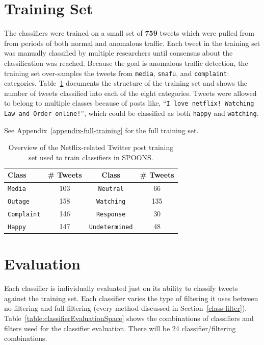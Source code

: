 \documentclass[12pt]{ucthesis}
\begin{document}
\section{Training Set}
\label{class-training-set}

The classifiers were trained on a small set of \textbf{759} tweets which were pulled from from periods of both normal and
anomalous traffic. Each tweet in the training set was manually classified by multiple researchers until consensus
about the classification was reached. Because the goal is anomalous traffic detection, the training set over-samples the
tweets from \texttt{media}, \texttt{snafu}, and \texttt{complaint}: categories. Table~\ref{table:classCounts} documents
the structure of the training set and shows the  number of tweets classified into each of the eight categories.
Tweets were allowed to belong to multiple classes because of posts like, ``\texttt{I love netflix! Watching Law and Order
online!}'', which could be classified as both \texttt{happy} and \texttt{watching}.

See Appendix~\ref{appendix-full-training} for the full training set.

\begin{table}
   \begin{center}
      \begin{tabular}{|l|c|c|c|}
         \hline
         Class  & \# Tweets & Class & \# Tweets
         \tabularnewline\hline
         \texttt{Media} & 103 & \texttt{Neutral} & 66
         \tabularnewline\hline
         \texttt{Outage} & 158  & \texttt{Watching} &  135
         \tabularnewline\hline
         \texttt{Complaint}  & 146 &  \texttt{Response} &  30
         \tabularnewline\hline
         \texttt{Happy}  & 147  & \texttt{Undetermined}  & 48
         \tabularnewline\hline
      \end{tabular}
      \caption[Netflix-related Twitter Traffic]{Overview of the Netflix-related Twitter post training set used to train classifiers in SPOONS.}
      \label{table:classCounts}
   \end{center}
\end{table}

\section{Evaluation}
\label{class-evaluation}
Each classifier is individually evaluated just on its ability to classify tweets against the training set.
Each classifier varies the type of filtering it uses between no filtering and full filtering (every method discussed in Section~\ref{class-filter}).
Table~\ref{table:classifierEvaluationSpace} shows the combinations of classifiers and filters used for the classifier evaluation.
There will be 24 classifier/filtering combinations.
\end{document}
